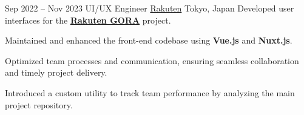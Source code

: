 \cventry
{Sep 2022 – Nov 2023}
{UI/UX Engineer}
{\href{https://global.rakuten.com/corp/}{Rakuten}}
{Tokyo, Japan}
{}
{Developed user interfaces for the \href{https://gora.golf.rakuten.co.jp/}{\textbf{Rakuten GORA}} project.}

\cvlistitem
{Maintained and enhanced the front-end codebase using \textbf{Vue.js} and \textbf{Nuxt.js}.}

\cvlistitem
{Optimized team processes and communication, ensuring seamless collaboration and timely project delivery.}

\cvlistitem
{Introduced a custom utility to track team performance by analyzing the main project repository.}
